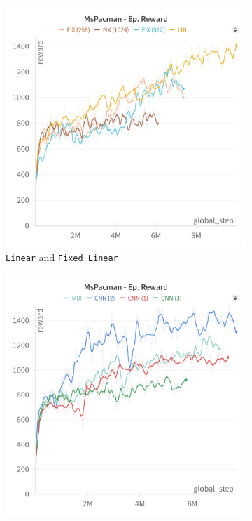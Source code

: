 \begin{figure}[ht]
    \centering
    \begin{subfigure}[b]{0.45\textwidth}
        \centering
        \includegraphics[width=\textwidth]{images/mspacman_lin_fix.png}
        \caption{\texttt{Linear} and \texttt{Fixed Linear}}
        \label{fig:mspacman_lin_fix}
    \end{subfigure}
    \hfill
    \begin{subfigure}[b]{0.45\textwidth}
        \centering
        \includegraphics[width=\textwidth]{images/mspacman_cnn_mixed.png}

\end{subfigure}
\end{figure}
